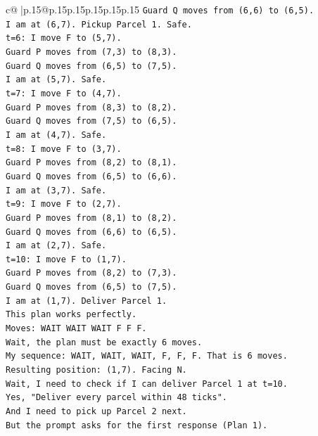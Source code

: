 \documentclass{article}
\begin{document}
{\begin{supertabular}{c@{$\;$}|p{.15\linewidth}@{}p{.15\linewidth}p{.15\linewidth}p{.15\linewidth}p{.15\linewidth}p{.15\linewidth}}
{{{\texttt{Guard Q moves from (6,6) to (6,5).} \\
\texttt{I am at (6,7). Pickup Parcel 1. Safe.} \\
\texttt{t=6: I move F to (5,7).} \\
\texttt{Guard P moves from (7,3) to (8,3).} \\
\texttt{Guard Q moves from (6,5) to (7,5).} \\
\texttt{I am at (5,7). Safe.} \\
\texttt{t=7: I move F to (4,7).} \\
\texttt{Guard P moves from (8,3) to (8,2).} \\
\texttt{Guard Q moves from (7,5) to (6,5).} \\
\texttt{I am at (4,7). Safe.} \\
\texttt{t=8: I move F to (3,7).} \\
\texttt{Guard P moves from (8,2) to (8,1).} \\
\texttt{Guard Q moves from (6,5) to (6,6).} \\
\texttt{I am at (3,7). Safe.} \\
\texttt{t=9: I move F to (2,7).} \\
\texttt{Guard P moves from (8,1) to (8,2).} \\
\texttt{Guard Q moves from (6,6) to (6,5).} \\
\texttt{I am at (2,7). Safe.} \\
\texttt{t=10: I move F to (1,7).} \\
\texttt{Guard P moves from (8,2) to (7,3).} \\
\texttt{Guard Q moves from (6,5) to (7,5).} \\
\texttt{I am at (1,7). Deliver Parcel 1.} \\
\texttt{This plan works perfectly.} \\
\texttt{Moves: WAIT WAIT WAIT F F F.} \\
\texttt{Wait, the plan must be exactly 6 moves.} \\
\texttt{My sequence: WAIT, WAIT, WAIT, F, F, F. That is 6 moves.} \\
\texttt{Resulting position: (1,7). Facing N.} \\
\texttt{Wait, I need to check if I can deliver Parcel 1 at t=10.} \\
\texttt{Yes, "Deliver every parcel within 48 ticks".} \\
\texttt{And I need to pick up Parcel 2 next.} \\
\texttt{But the prompt asks for the first response (Plan 1).} \\
}}}
\end{supertabular}}
\end{document}
